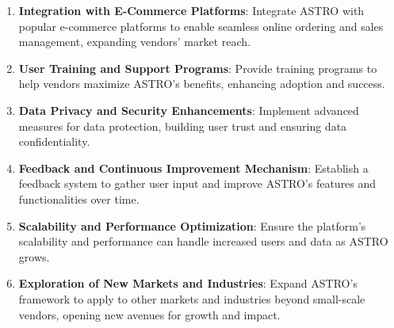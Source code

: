 \begin{enumerate}
    \item \textbf{Integration with E-Commerce Platforms}: Integrate ASTRO with popular e-commerce platforms to enable seamless online ordering and sales management, expanding vendors’ market reach.
    \item \textbf{User Training and Support Programs}: Provide training programs to help vendors maximize ASTRO’s benefits, enhancing adoption and success.
    \item \textbf{Data Privacy and Security Enhancements}: Implement advanced measures for data protection, building user trust and ensuring data confidentiality.
    \item \textbf{Feedback and Continuous Improvement Mechanism}: Establish a feedback system to gather user input and improve ASTRO’s features and functionalities over time.
    \item \textbf{Scalability and Performance Optimization}: Ensure the platform’s scalability and performance can handle increased users and data as ASTRO grows.
    \item \textbf{Exploration of New Markets and Industries}: Expand ASTRO’s framework to apply to other markets and industries beyond small-scale vendors, opening new avenues for growth and impact.
\end{enumerate}
